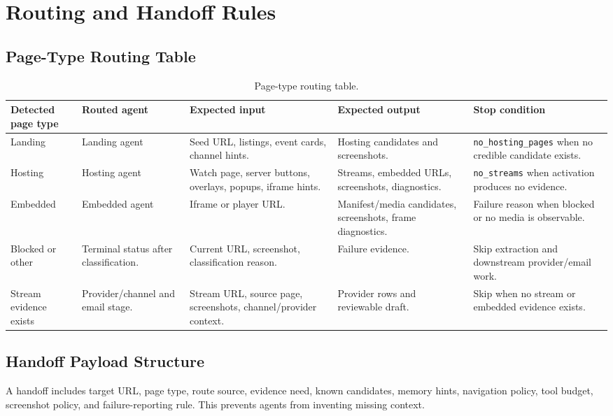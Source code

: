 \section{Routing and Handoff Rules}

\subsection{Page-Type Routing Table}

\begin{table}[!htbp]
\centering
\begin{tabularx}{\textwidth}{Q{2.7cm} Y Y Y Y}
\toprule
{}
Detected page type & Routed agent & Expected input & Expected output & Stop condition \\
\midrule
Landing & Landing agent & Seed URL, listings, event cards, channel hints. &
Hosting candidates and screenshots. & \texttt{no\_hosting\_\allowbreak pages}
when no credible candidate exists. \\
Hosting & Hosting agent & Watch page, server buttons, overlays, popups,
iframe hints. & Streams, embedded URLs, screenshots, diagnostics. &
\texttt{no\_streams} when activation produces no evidence. \\
Embedded & Embedded agent & Iframe or player URL. & Manifest/media
candidates, screenshots, frame diagnostics. & Failure reason when blocked or
no media is observable. \\
Blocked or other & Terminal status after classification. & Current URL,
screenshot, classification reason. & Failure evidence. & Skip extraction and
downstream provider/email work. \\
Stream evidence exists & Provider/channel and email stage. & Stream URL,
source page, screenshots, channel/provider context. & Provider rows and
reviewable draft. & Skip when no stream or embedded evidence exists. \\
\bottomrule
\end{tabularx}
\caption{Page-type routing table.}
\label{tab:routing-decision}
\end{table}

\subsection{Handoff Payload Structure}

A handoff includes target URL, page type, route source, evidence need, known
candidates, memory hints, navigation policy, tool budget, screenshot policy,
and failure-reporting rule. This prevents agents from inventing missing
context.

